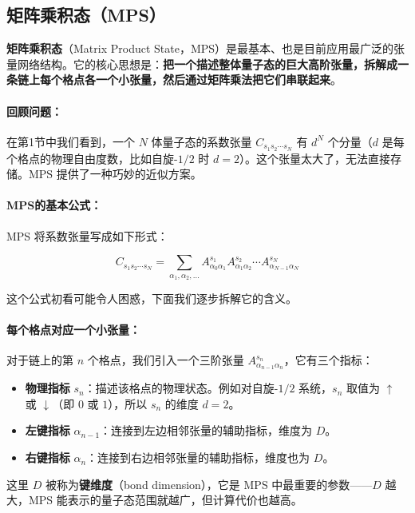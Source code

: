 \documentclass[12pt,a4paper]{ctexart}
\begin{document}
\subsection{矩阵乘积态（MPS）}

\textbf{矩阵乘积态}（Matrix Product State，MPS）是最基本、也是目前应用最广泛的张量网络结构。它的核心思想是：\textbf{把一个描述整体量子态的巨大高阶张量，拆解成一条链上每个格点各一个小张量，然后通过矩阵乘法把它们串联起来}。

\paragraph{回顾问题：} 在第1节中我们看到，一个 $N$ 体量子态的系数张量 $C_{s_1 s_2 \cdots s_N}$ 有 $d^N$ 个分量（$d$ 是每个格点的物理自由度数，比如自旋-$1/2$ 时 $d=2$）。这个张量太大了，无法直接存储。MPS 提供了一种巧妙的近似方案。

\paragraph{MPS的基本公式：} MPS 将系数张量写成如下形式：

\begin{equation}
    C_{s_1 s_2 \cdots s_N} = \sum_{\alpha_1, \alpha_2, \ldots} A^{s_1}_{\alpha_0 \alpha_1} A^{s_2}_{\alpha_1 \alpha_2} \cdots A^{s_N}_{\alpha_{N-1} \alpha_N}
\end{equation}

这个公式初看可能令人困惑，下面我们逐步拆解它的含义。

\paragraph{每个格点对应一个小张量：} 对于链上的第 $n$ 个格点，我们引入一个三阶张量 $A^{s_n}_{\alpha_{n-1}\alpha_n}$，它有三个指标：
\begin{itemize}
    \item \textbf{物理指标} $s_n$：描述该格点的物理状态。例如对自旋-$1/2$ 系统，$s_n$ 取值为 $\uparrow$ 或 $\downarrow$（即 $0$ 或 $1$），所以 $s_n$ 的维度 $d=2$。
    \item \textbf{左键指标} $\alpha_{n-1}$：连接到左边相邻张量的辅助指标，维度为 $D$。
    \item \textbf{右键指标} $\alpha_n$：连接到右边相邻张量的辅助指标，维度也为 $D$。
\end{itemize}
这里 $D$ 被称为\textbf{键维度}（bond dimension），它是 MPS 中最重要的参数——$D$ 越大，MPS 能表示的量子态范围就越广，但计算代价也越高。
\end{document}
